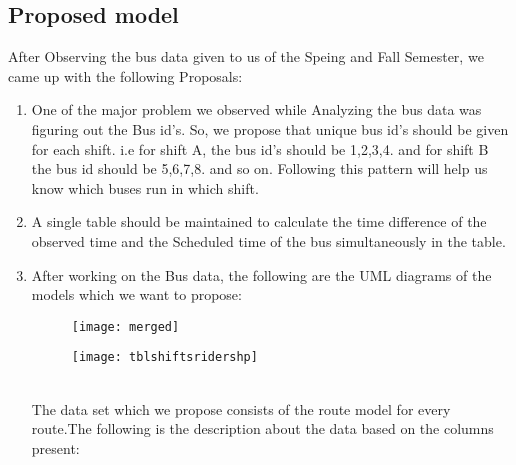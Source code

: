 \documentclass[12pt]{article}
\begin{document}
\subsection{Proposed model}
After Observing the bus data given to us of the Speing and Fall Semester, we came up with the following Proposals:
\begin{enumerate}
	\item One of the major problem we observed while Analyzing the bus data was figuring out the Bus id's. So, we propose that unique bus id's should be given for each shift. i.e for shift A, the bus id's should be 1,2,3,4. and for shift B the bus id should be 5,6,7,8. and so on. Following this pattern will help us know which buses run in which shift.
	\item A single table should be maintained to calculate the time difference of the observed time and the Scheduled time of the bus simultaneously in the table.
	
	\item After working on the Bus data, the following are the UML diagrams of the models which we want to propose:
	
	\begin{figure}[ht!]
		
		\centering
		\texttt{[image: merged]}
		
	\end{figure}
	
	\begin{figure}[ht!]
		
		\centering
		\texttt{[image: tblshiftsridershp]}
		
	\end{figure}
	\break
	
	\\The data set which we propose consists of the route model for every route.The following is the description about the data based on the columns present:
	

\end{enumerate}
\end{document}
